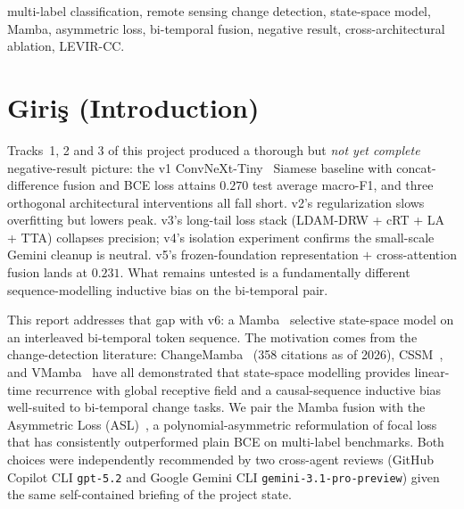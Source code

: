 \documentclass[journal]{IEEEtran}
\begin{document}
\begin{IEEEkeywords}
multi-label classification, remote sensing change detection, state-space model, Mamba, asymmetric loss, bi-temporal fusion, negative result, cross-architectural ablation, LEVIR-CC.
\end{IEEEkeywords}

\section{Giri\c{s} (Introduction)}\label{sec:giris}
Tracks~1, 2 and 3 of this project produced a thorough but \emph{not yet complete} negative-result picture: the v1 ConvNeXt-Tiny~\cite{liu2022convnext} Siamese baseline with concat-difference fusion and BCE loss attains $0.270$ test average macro-F1, and three orthogonal architectural interventions all fall short. v2's regularization slows overfitting but lowers peak. v3's long-tail loss stack (LDAM-DRW + cRT + LA + TTA) collapses precision; v4's isolation experiment confirms the small-scale Gemini cleanup is neutral. v5's frozen-foundation representation $+$ cross-attention fusion lands at $0.231$. What remains untested is a fundamentally different sequence-modelling inductive bias on the bi-temporal pair.

This report addresses that gap with v6: a Mamba~\cite{gu2023mamba} selective state-space model on an interleaved bi-temporal token sequence. The motivation comes from the change-detection literature: ChangeMamba~\cite{chen2024changemamba} (358 citations as of 2026), CSSM~\cite{ghazaei2025cssm}, and VMamba~\cite{liu2024vmamba} have all demonstrated that state-space modelling provides linear-time recurrence with global receptive field and a causal-sequence inductive bias well-suited to bi-temporal change tasks. We pair the Mamba fusion with the Asymmetric Loss (ASL)~\cite{ridnik2021asl}, a polynomial-asymmetric reformulation of focal loss~\cite{lin2017focal} that has consistently outperformed plain BCE on multi-label benchmarks. Both choices were independently recommended by two cross-agent reviews (GitHub Copilot CLI \texttt{gpt-5.2} and Google Gemini CLI \texttt{gemini-3.1-pro-preview}) given the same self-contained briefing of the project state.
\end{document}
